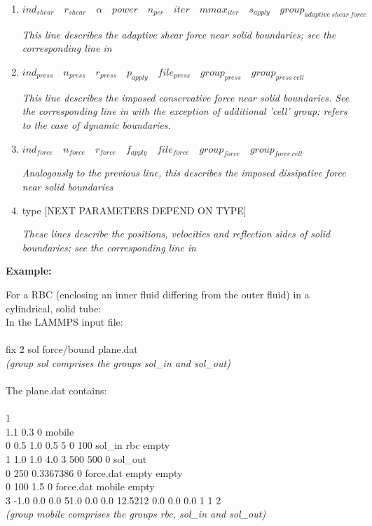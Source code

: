 \begin{enumerate}
\item $  ind_{shear} \quad   r_{shear} \quad   \alpha \quad   power \quad   n_{per} \quad   iter \quad   mmax_{iter} \quad   s_{apply} \quad   group_{adaptive\ shear\ force}$

	{\em This line describes the adaptive shear force near solid boundaries; see the corresponding line in }

\item $  ind_{press} \quad n_{press} \quad r_{press} \quad p_{apply} \quad file_{press} \quad group_{press} \quad group_{press\ cell}$

	{\em This line describes the imposed conservative force near solid boundaries. See the corresponding line in  with the exception of additional 'cell' group: refers to the case of \textit{dynamic} boundaries.}

\item $  ind_{force} \quad n_{force} \quad r_{force} \quad f_{apply} \quad file_{force} \quad group_{force} \quad group_{force\ cell}$

	{\em Analogously to the previous line, this describes the imposed dissipative force near solid boundaries}

\item {type} [NEXT PARAMETERS DEPEND ON TYPE]

	{\em These lines describe the positions, velocities and reflection sides of solid boundaries; see the corresponding line in }

\end{enumerate}

\textbf{Example:}

For a RBC (enclosing an inner fluid differing from the outer fluid) in a cylindrical, solid tube:\\
In the LAMMPS input file:\\ \\
fix	2 sol force/bound plane.dat\\
\textit{(group sol comprises the groups sol\_in and sol\_out)}\\ \\
The plane.dat contains:\\ \\
1\\
1.1 0.3 0 mobile\\
0 0.5 1.0 0.5 5 0 100 sol\_in rbc empty\\
1 1.0 1.0 4.0 3 500 500 0 sol\_out\\
0 250 0.3367386 0 force.dat empty empty\\
0 100 1.5 0 force.dat mobile empty\\
3 -1.0 0.0 0.0 51.0 0.0 0.0 12.5212 0.0 0.0 0.0 1 1 2\\
\textit{(group mobile comprises the groups rbc, sol\_in and sol\_out)}\\

